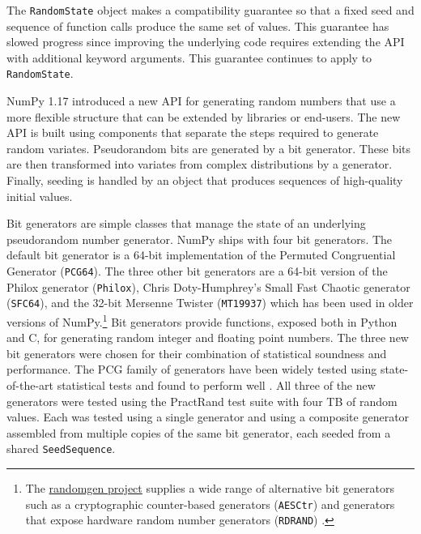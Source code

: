 The \texttt{RandomState} object makes a compatibility guarantee so that a fixed
seed and sequence of function calls produce the same set of values. This
guarantee has slowed progress since improving the underlying code requires
extending the API with additional keyword arguments. This guarantee continues to
apply to \texttt{RandomState}.

NumPy 1.17 introduced a new API for generating random numbers that use a more
flexible structure that can be extended by libraries or end-users. The new API
is built using components that separate the steps required to generate random
variates. Pseudorandom bits are generated by a bit generator. These bits are
then transformed into variates from complex distributions by a generator.
Finally, seeding is handled by an object that produces sequences of high-quality
initial values.

Bit generators are simple classes that manage the state of an underlying
pseudorandom number generator. NumPy ships with four bit generators. The default
bit generator is a 64-bit implementation of the Permuted Congruential Generator
\cite{pcg64} (\texttt{PCG64}). The three other bit generators are a 64-bit version
of the Philox generator \cite{random123} (\texttt{Philox}), Chris Doty-Humphrey's
Small Fast Chaotic generator \cite{practrand} (\texttt{SFC64}), and the 32-bit
Mersenne Twister \cite{mt19937} (\texttt{MT19937}) which has been used in older
versions of NumPy.\footnote{The
\href{https://github.com/bashtage/randomgen}{randomgen project} supplies a wide
range of alternative bit generators such as a cryptographic counter-based
generators (\texttt{AESCtr}) and generators that expose hardware random number
generators (\texttt{RDRAND}) \cite{randomgen}.} Bit generators provide
functions, exposed both in Python and C, for generating random integer
and floating point numbers. The three new bit generators were chosen for their
combination of statistical soundness and performance. The PCG family of generators
have been widely tested using state-of-the-art statistical tests and found to
perform well \cite{lemire_blog}. All three of the new generators were tested
using the PractRand test suite \cite{practrand} with four TB of random values.
Each was tested using a single generator and using a composite generator assembled
from multiple copies of the same bit generator, each seeded from a shared
\texttt{SeedSequence}.

